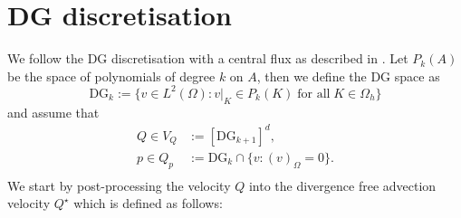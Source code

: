 \documentclass[11pt]{article}
\begin{document}
\section{DG discretisation}
We follow the DG discretisation with a central flux as described in \cite{Guzman2016}. Let $P_k(A)$ be the space of polynomials of degree $k$ on $A$, then we define the DG space as
\begin{equation}
    \text{DG}_k := \{ v\in L^2(\Omega) : v|_K \in P_k(K) \;\text{for all}\;K\in \Omega_h \}
\end{equation}
and assume that
\begin{equation}
    \begin{aligned}
        Q \in V_Q & := [\text{DG}_{k+1}]^d,                    \\
        p \in Q_p & := \text{DG}_{k}\cap \{v:(v)_{\Omega}=0\}. \\
    \end{aligned}\label{eqn:function_spaces}
\end{equation}
We start by post-processing the velocity $Q$ into the divergence free advection velocity $Q^\star$ which is defined as follows:
\end{document}
